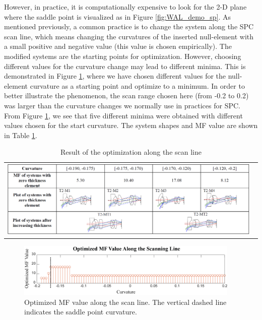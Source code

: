 However, in practice, it is computationally expensive to look for the 2-D plane where the saddle point is visualized as in Figure \ref{fig:WAL_demo_sp}. As mentioned previously, a common practice is to change the system along the SPC scan line, which means changing the curvatures of the inserted null-element with a small positive and negative value (this value is chosen empirically). The modified systems are the starting points for optimization. However, choosing different values for the curvature change may lead to different minima. This is demonstrated in Figure \ref{fig: scanning_line}, where we have chosen different values for the null-element curvature as a starting point and optimize to a minimum. In order to better illustrate the phenomenon, the scan range chosen here (from -0.2 to 0.2) was larger than the curvature changes we normally use in practices for SPC. From Figure \ref{fig: scanning_line}, we see that five different minima were obtained with different values chosen for the start curvature. The system shapes and MF value are shown in Table \ref{table: scanline}. 
\begin{table}[h!]
    \centering
    \captionsetup{justification=centering}
    \caption{Result of the optimization along the scan line}
    \label{table: scanline}
    \vspace{-1em}
    \hspace*{-16.5pt} %
    \begin{tabular}{l}
    \includegraphics[width=0.98\textwidth]{chapter-4/figures/Line_Opt_table.png}
    \end{tabular}
\end{table}
\begin{figure}[h!]
    \centering
    \includegraphics[width=0.95\textwidth]{chapter-4/figures/Scanning_Line_plot.png}
    \caption{Optimized MF value along the scan line. The vertical dashed line indicates the saddle point curvature.}
    \label{fig: scanning_line}
\end{figure}
